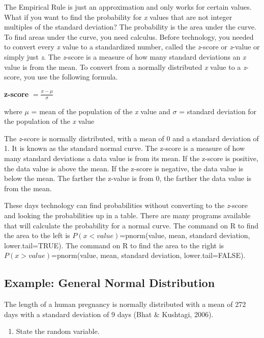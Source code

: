\documentclass[]{book}
\providecommand{\tightlist}{%
  \setlength{\itemsep}{0pt}\setlength{\parskip}{0pt}}
\begin{document}
The Empirical Rule is just an approximation and only works for certain values. What if you want to find the probability for \emph{x} values that are not integer multiples of the standard deviation? The probability is the area under the curve. To find areas under the curve, you need calculus. Before technology, you needed to convert every \emph{x} value to a standardized number, called the \emph{z}-score or \emph{z}-value or simply just \emph{z}. The \emph{z}-score is a measure of how many standard deviations an \emph{x} value is from the mean. To convert from a normally distributed \emph{x} value to a \emph{z}-score, you use the following formula.

\textbf{z-score}
\(=\frac{x-\mu}{\sigma}\)

where \(\mu\) = mean of the population of the \emph{x} value and \(\sigma\) = standard deviation for the population of the \emph{x} value

The \emph{z}-score is normally distributed, with a mean of 0 and a standard deviation of 1. It is known as the standard normal curve. The z-score is a measure of how many standard deviations a data value is from its mean. If the z-score is positive, the data value is above the mean. If the z-score is negative, the data value is below the mean. The farther the z-value is from 0, the farther the data value is from the mean.

These days technology can find probabilities without converting to the \emph{z}-score and looking the probabilities up in a table. There are many programs available that will calculate the probability for a normal curve. The command on R to find the area to the left is \(P(x<value)\)=pnorm(value, mean, standard deviation, lower.tail=TRUE). The command on R to find the area to the right is \(P(x>value)\)=pnorm(value, mean, standard deviation, lower.tail=FALSE).

\hypertarget{example-general-normal-distribution}{%
\subsection{Example: General Normal Distribution}\label{example-general-normal-distribution}}

The length of a human pregnancy is normally distributed with a mean of 272 days with a standard deviation of 9 days (Bhat \& Kushtagi, 2006).

\begin{enumerate}
\def\labelenumi{\alph{enumi}.}
\tightlist
\item
  State the random variable.
\end{enumerate}
\end{document}
